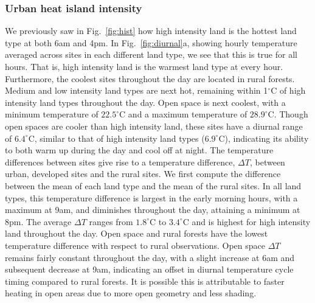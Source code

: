 \documentclass[draft,linenumbers]{agujournal}
\begin{document}
\subsubsection{Urban heat island intensity}
We previously saw in Fig.~\ref{fig:hist} how high intensity land is the hottest land type at both 6am and 4pm.  In Fig.~\ref{fig:diurnal}a, showing hourly temperature averaged across sites in each different land type, we see that this is true for all hours. That is, high intensity land is the warmest land type at every hour. Furthermore, the coolest sites throughout the day are located in rural forests. 
Medium and low intensity land types are next hot, remaining within 1$^\circ$C of high intensity land types throughout the day. Open space is next coolest, with a minimum temperature of $22.5^\circ$C and a maximum temperature of $28.9^\circ$C. 
Though open spaces are cooler than high intensity land, these sites have a diurnal range of $6.4^\circ$C, similar to that of high intensity land types ($6.9^\circ$C), indicating its ability to both warm up during the day and cool off at night. 
The temperature differences between sites give rise to a temperature difference, $\Delta T$, between urban, developed sites and the rural sites. We first compute the difference between the mean of each land type and the mean of the rural sites. 
In all land types, this temperature difference is largest in the early morning hours, with a maximum at 9am, and diminishes throughout the day, attaining a minimum at 8pm. The average $\Delta T$ ranges from $1.8^\circ$C to $3.4^\circ$C
and is highest for high intensity land throughout the day. Open space and rural forests have the lowest temperature difference with respect to rural observations. Open space $\Delta T$ remains fairly constant throughout the day, with a slight increase at 6am and subsequent decrease at 9am, indicating an offset in diurnal temperature cycle timing compared to rural forests. It is possible this is attributable to faster heating in open areas due to more open geometry and less shading. 
\end{document}
